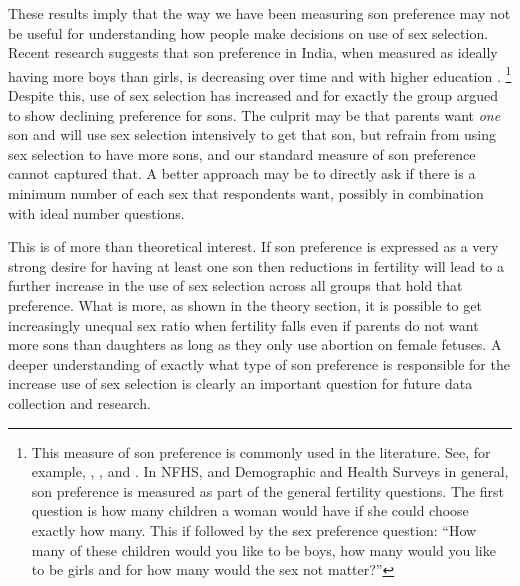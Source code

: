 \documentclass[12pt,letterpaper]{article}
\begin{document}
These results imply that the way we have been measuring son preference may not be useful
for understanding how people make decisions on use of sex selection.
Recent research suggests that son preference in India, when measured as ideally having 
more boys than girls, is decreasing over time and with higher education \citep{bhat03,pande07}.%
\footnote{
This measure of son preference is commonly used in the literature. 
See, for example, \citet{clark00}, \citet{Jensen2009}, and \cite{Hu2015}.
In NFHS, and Demographic and Health Surveys in general, son preference is measured as part 
of the general fertility questions.
The first question is how many children a woman would have if she could choose exactly how 
many.
This if followed by the sex preference question:
``How many of these children would you like to be boys, how many would you like to be girls 
and for how many would the sex not matter?''
}
Despite this, use of sex selection has increased and for exactly the group 
argued to show declining preference for sons.
The culprit may be that parents want \emph{one} son and will use sex selection 
intensively to get that son, but refrain from using sex selection to have more sons, 
and our standard measure of son preference cannot captured that.
A better approach may be to directly ask if there is a minimum number of each sex that 
respondents want, possibly in combination with ideal number questions.

This is of more than theoretical interest.
If son preference is expressed as a very strong desire for having at least one
son then reductions in fertility will lead to a further increase in the use of sex 
selection across all groups that hold that preference.
What is more, as shown in the theory section, it is possible to get increasingly
unequal sex ratio when fertility falls even if parents do not want more sons
than daughters as long as they only use abortion on female fetuses.
A deeper understanding of exactly what type of son preference is responsible 
for the increase use of sex selection is clearly an important question for
future data collection and research.

\end{document}

